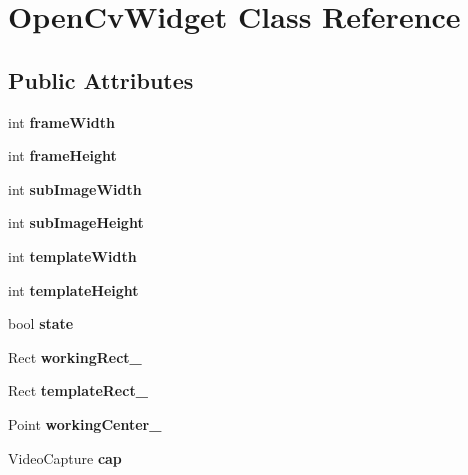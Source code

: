 \hypertarget{class_open_cv_widget}{}\section{Open\+Cv\+Widget Class Reference}
\label{class_open_cv_widget}
\subsection*{Public Attributes}
\begin{DoxyCompactItemize}
\item 
\mbox{\label{class_open_cv_widget_a95a6faa37072434e852d626f0a3ee5a9}} 
int {\bfseries frame\+Width}
\item 
\mbox{\label{class_open_cv_widget_a5dd41b76affe4c4a37b9502bf7ed9dda}} 
int {\bfseries frame\+Height}
\item 
\mbox{\label{class_open_cv_widget_aedde6affb6c0d453f563195013800d9e}} 
int {\bfseries sub\+Image\+Width}
\item 
\mbox{\label{class_open_cv_widget_a6cb6b03a5d6ef68a55ff2aaae6a12465}} 
int {\bfseries sub\+Image\+Height}
\item 
\mbox{\label{class_open_cv_widget_abcfddda69b2bc5752751d8df8ee27691}} 
int {\bfseries template\+Width}
\item 
\mbox{\label{class_open_cv_widget_a2d3122dccb9094d5fea1ca8bbc439954}} 
int {\bfseries template\+Height}
\item 
\mbox{\label{class_open_cv_widget_aa241205fdfbc332e7bc40974a4bc5667}} 
bool {\bfseries state}
\item 
\mbox{\label{class_open_cv_widget_ad0cb1cbe57dd17e340461a6f60f743cf}} 
Rect {\bfseries working\+Rect\+\_\+}
\item 
\mbox{\label{class_open_cv_widget_a81c8a710b09fa082c8288f5781030fb0}} 
Rect {\bfseries template\+Rect\+\_\+}
\item 
\mbox{\label{class_open_cv_widget_aaf9445696f65d650ae8ee576dc303eaf}} 
Point {\bfseries working\+Center\+\_\+}
\item 
\mbox{\label{class_open_cv_widget_a1ede2abdfc5042232566cb2eec7844ee}} 
Video\+Capture {\bfseries cap}
\end{DoxyCompactItemize}



